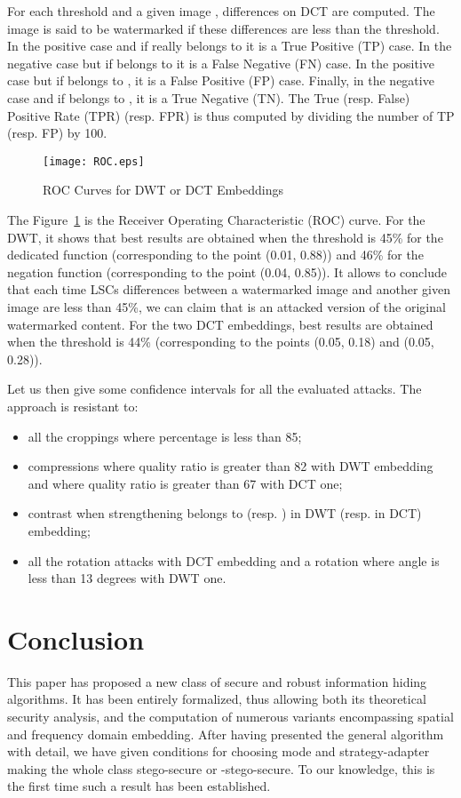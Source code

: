 \documentclass{comjnl}
\begin{document}
For each threshold  and a given image 
, 
differences on DCT are computed. The image is said to be watermarked
if these differences are less than the threshold. 
In the positive case and if  really belongs to 
 it is a True Positive (TP) case.  
In the negative case but if  belongs to 
 it is a False Negative (FN) case.  
In the positive case but if   belongs to 
, it is a False Positive (FP) case.  
Finally, in the negative case and if  belongs to
, it is a True Negative (TN).  
The True (resp. False) Positive Rate  (TPR) (resp. FPR) is thus computed 
by dividing the number of TP (resp. FP) by 100.

\begin{figure}[ht]
\begin{center}
\texttt{[image: ROC.eps]}
\end{center}
\caption{ROC Curves for DWT or DCT Embeddings}\label{fig:roc:dwt}
\end{figure}

The Figure~\ref{fig:roc:dwt} is the Receiver Operating Characteristic (ROC) 
curve. 
For the DWT, it shows that best results are obtained when the threshold 
is 45\% for the dedicated function (corresponding to the point (0.01, 0.88))
and  46\% for the negation function (corresponding to the point (0.04, 0.85)).
It allows to conclude that each time LSCs differences between
a watermarked image and another given image   are less than 45\%, we can claim that 
 is an attacked version of the original watermarked content.
For the two DCT embeddings, best results are obtained when the threshold 
is 44\% (corresponding to the points (0.05, 0.18) and (0.05, 0.28)).

Let us then give some confidence intervals for all the evaluated attacks. The
approach is resistant to:
\begin{itemize}
\item all the croppings where percentage is less than 85;
\item compressions where quality ratio is greater 
  than 82 with DWT embedding and 
  where quality ratio is greater than 67 with DCT one;
\item contrast when strengthening belongs to  
(resp. )  in DWT (resp. in DCT) embedding;
\item all the rotation attacks with DCT embedding and a rotation where
angle is less than 13 degrees with DWT one.
\end{itemize}


\section{Conclusion}\label{sec:concl}
This paper has proposed a new class of secure and robust information hiding 
algorithms.
It has been entirely formalized, thus allowing both its theoretical security 
analysis, and the computation of numerous variants encompassing spatial and 
frequency domain embedding.
After having presented the general algorithm with detail, we have given
conditions for choosing mode and strategy-adapter making the whole
class  stego-secure or -stego-secure.
To our knowledge, this is the first time such a result has been established.
\end{document}
